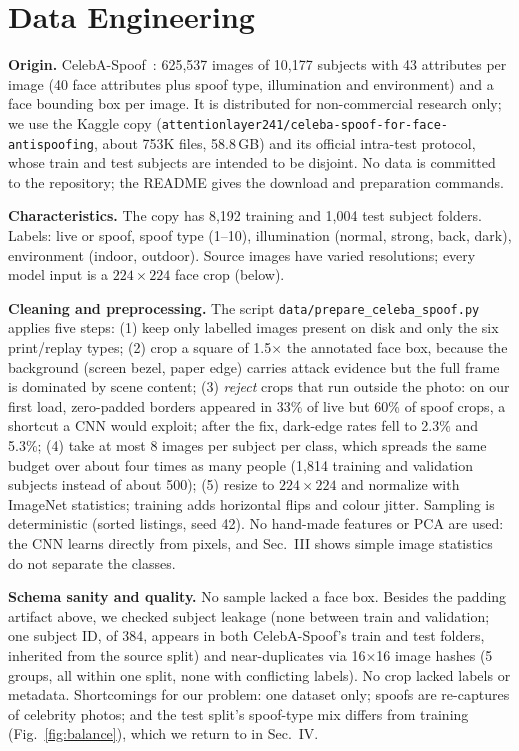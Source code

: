\documentclass[conference]{IEEEtran}
\begin{document}
\section{Data Engineering}
\textbf{Origin.} CelebA-Spoof~\cite{zhang2020celebaspoof}: 625,537 images of 10,177 subjects with 43 attributes
per image (40 face attributes plus spoof type, illumination and environment) and a face bounding box per image.
It is distributed for non-commercial research only; we use the Kaggle copy
(\texttt{attentionlayer241/\allowbreak celeba-spoof-\allowbreak for-face-\allowbreak antispoofing}, about 753K files, 58.8\,GB) and its official
intra-test protocol, whose train and test subjects are intended to be disjoint. No data is committed to the repository; the
README gives the download and preparation commands.

\textbf{Characteristics.} The copy has 8,192 training and 1,004 test subject folders. Labels: live or spoof,
spoof type (1--10), illumination (normal, strong, back, dark), environment (indoor, outdoor). Source images have
varied resolutions; every model input is a $224\times224$ face crop (below).

\textbf{Cleaning and preprocessing.} The script \texttt{data/\allowbreak prepare\_celeba\_\allowbreak spoof.py} applies five steps:
(1) keep only labelled images present on disk and only the six print/replay types;
(2) crop a square of 1.5$\times$ the annotated face box, because the background (screen bezel, paper edge)
carries attack evidence but the full frame is dominated by scene content;
(3) \emph{reject} crops that run outside the photo: on our first load, zero-padded borders appeared in 33\% of
live but 60\% of spoof crops, a shortcut a CNN would exploit; after the fix, dark-edge rates fell to 2.3\% and 5.3\%;
(4) take at most 8 images per subject per class, which spreads the same budget over about four times as many
people (1,814 training and validation subjects instead of about 500);
(5) resize to $224\times224$ and normalize with ImageNet statistics; training adds horizontal flips and colour
jitter. Sampling is deterministic (sorted listings, seed 42). No hand-made features or PCA are used: the CNN
learns directly from pixels, and Sec.~III shows simple image statistics do not separate the classes.

\textbf{Schema sanity and quality.} No sample lacked a face box. Besides the padding artifact above, we checked
subject leakage (none between train and validation; one subject ID, of 384, appears in both CelebA-Spoof's
train and test folders, inherited from the source split) and near-duplicates via 16$\times$16 image hashes
(5 groups, all within one split, none with conflicting labels). No crop lacked labels or metadata.
Shortcomings for our problem: one dataset only; spoofs are re-captures of celebrity photos; and the test split's
spoof-type mix differs from training (Fig.~\ref{fig:balance}), which we return to in Sec.~IV.
\end{document}
